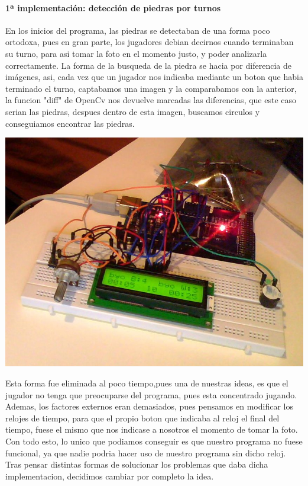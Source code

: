 \documentclass[12pt,a4paper]{report}
\begin{document}
\paragraph{1ª implementación: detección de piedras por turnos}
En los inicios del programa, las piedras se detectaban de una forma poco
ortodoxa, pues en gran parte, los jugadores debian decirnos cuando terminaban su
turno, para asi tomar la foto en el momento justo, y poder analizarla
correctamente.  La forma de la busqueda de la piedra se hacia por diferencia de
imágenes, asi, cada vez que un jugador nos indicaba mediante un boton que habia
terminado el turno, captabamos una imagen y la comparabamos con la anterior, la
funcion "diff" de OpenCv nos devuelve marcadas las diferencias, que este caso
serian las piedras, despues dentro de esta imagen, buscamos circulos y
conseguiamos encontrar las piedras.  

\includegraphics[scale=0.4]{reloj.jpg}

Esta forma fue eliminada al poco tiempo,pues una de nuestras ideas, es que el
jugador no tenga que preocuparse del programa, pues esta concentrado jugando.
Ademas, los factores externos eran demasiados, pues pensamos en modificar los
relojes de tiempo, para que el propio
boton que indicaba al reloj el final del tiempo, fuese el mismo que nos indicase
a nosotros el momento de tomar la foto. Con todo esto, lo unico que podiamos
conseguir es que nuestro programa no fuese funcional, ya que nadie podria hacer
uso de nuestro programa sin dicho reloj. Tras pensar distintas formas de
solucionar los problemas que daba dicha implementacion, decidimos cambiar por
completo la idea.  %
\end{document}
